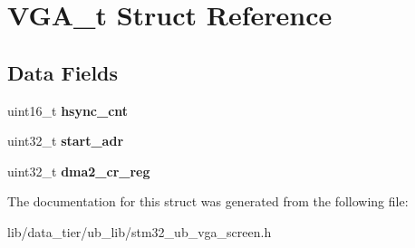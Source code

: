 \hypertarget{struct_v_g_a__t}{}\section{V\+G\+A\+\_\+t Struct Reference}
\label{struct_v_g_a__t}
\subsection*{Data Fields}
\begin{DoxyCompactItemize}
\item 
uint16\+\_\+t {\bfseries hsync\+\_\+cnt}\hypertarget{struct_v_g_a__t_a649bc185f93377aec7fa1c136dd2add0}{}\label{struct_v_g_a__t_a649bc185f93377aec7fa1c136dd2add0}

\item 
uint32\+\_\+t {\bfseries start\+\_\+adr}\hypertarget{struct_v_g_a__t_a7f47a855ae47844b419d75797f00fbbb}{}\label{struct_v_g_a__t_a7f47a855ae47844b419d75797f00fbbb}

\item 
uint32\+\_\+t {\bfseries dma2\+\_\+cr\+\_\+reg}\hypertarget{struct_v_g_a__t_a1fc3c1405cc22f5d4fc21eb58c47c06a}{}\label{struct_v_g_a__t_a1fc3c1405cc22f5d4fc21eb58c47c06a}

\end{DoxyCompactItemize}


The documentation for this struct was generated from the following file\+:\begin{DoxyCompactItemize}
\item 
lib/data\+\_\+tier/ub\+\_\+lib/stm32\+\_\+ub\+\_\+vga\+\_\+screen.\+h\end{DoxyCompactItemize}
